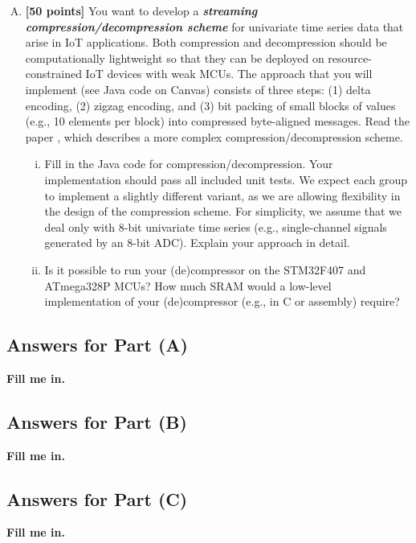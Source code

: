 \documentclass[11pt]{article}
\newcommand{\red}[1]{\textbf{\color{red} #1}}
\begin{document}
\begin{enumerate}[(A)]
\item
\textbf{[50 points]}
You want to develop a \textbf{\em streaming compression/decompression scheme} for univariate time series data that arise in IoT applications. Both compression and decompression should be computationally lightweight so that they can be deployed on resource-constrained IoT devices with weak MCUs. The approach that you will implement (see Java code on Canvas) consists of three steps: (1) delta encoding, (2) zigzag encoding, and (3) bit packing of small blocks of values (e.g., 10 elements per block) into compressed byte-aligned messages. Read the paper \cite{BlalockMG2018Sprintz}, which describes a more complex compression/decompression scheme.
\begin{enumerate}[(i)]
\item
Fill in the Java code for compression/decompression. Your implementation should pass all included unit tests. We expect each group to implement a slightly different variant, as we are allowing flexibility in the design of the compression scheme. For simplicity, we assume that we deal only with 8-bit univariate time series (e.g., single-channel signals generated by an 8-bit ADC). Explain your approach in detail.
\item
Is it possible to run your (de)compressor on the STM32F407 and ATmega328P MCUs? How much SRAM would a low-level implementation of your (de)compressor (e.g., in C or assembly) require?
\end{enumerate}
\end{enumerate}

\subsection*{Answers for Part (A)}

\red{Fill me in.}

\subsection*{Answers for Part (B)}

\red{Fill me in.}

\subsection*{Answers for Part (C)}

\red{Fill me in.}




\end{document}
